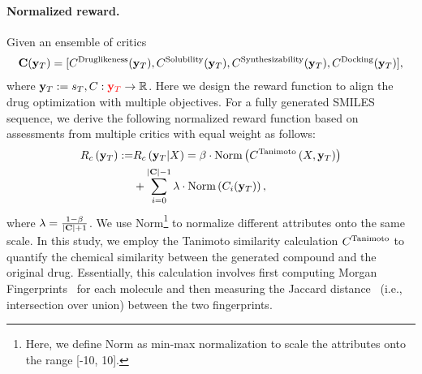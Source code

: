 \paragraph{{Normalized reward}.} 
Given an ensemble of critics 
{
\begin{align*}
\mathbf{C}{ \left( {
\mathbf{y}_{T}
} \right) }=[
{C}^{\text{Druglikeness}}{ \left( {\mathbf{y}_{T}} \right) },
{C}^{\text{Solubility}}{ \left( {\mathbf{y}_{T}} \right) },
{C}^{\text{Synthesizability}}{ \left( {\mathbf{y}_{T}} \right) }, {{C}^{\text{Docking}}}{ \left( {\mathbf{y}_{T}} \right) }
],
\end{align*}
}
where  $\mathbf{y}_{T}:=s_{T}, {C}: {\color{red} \mathbf{y}_{T}} \rightarrow \mathbb{R}$. 
Here we design the reward function to align the drug optimization with multiple objectives.
For a fully generated SMILES sequence, we derive the following
{normalized}
reward function based on assessments from multiple critics with equal weight \citep{liu2024erp} as follows:
{
\begin{align}\label{eq:reward}
{R_c\ensuremath{ \left( {\mathbf{y}_{T}} \right) }}:=&
{R_c \left( {
\mathbf{y}_{T}|X} \right) } =
\beta\cdot\text{Norm} \left( {{C}^{\text{Tanimoto}} \left( {X,
\mathbf{y}_{T}} \right) } \right) \notag \\ 
&+
\sum_{i=0}^{|\mathbf{C}|-1}\lambda\cdot\text{Norm} \left( {{C}_i{ \left( {\mathbf{y}_{T}} \right) }} \right) ,
\end{align}
}
where $\lambda=\frac{1-\beta}{|\mathbf{{C}}|+1}$.
{We use Norm\footnote{{Here, we define Norm as min-max normalization to scale the attributes onto the range [-10, 10].}} to normalize different attributes
{onto the} same scale.}
In this study, we employ the Tanimoto similarity calculation ${C}^{\text{Tanimoto}}$ to quantify the chemical similarity
between the generated compound and the original drug. 
Essentially, this calculation involves first computing Morgan Fingerprints~\citep{rogers2010extended} for each molecule and then measuring the 
{Jaccard distance~\citep{jaccard1912distribution} (i.e., intersection over union)}
 between the two fingerprints. 



